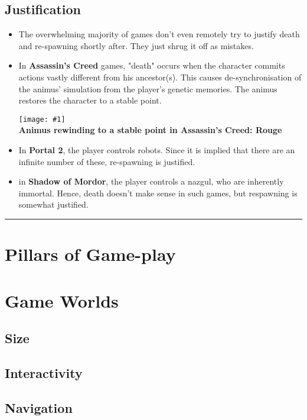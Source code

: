 \documentclass[12pt]{article}
\newcommand{\drawline}{\vspace{2mm}\hrule}
\newcommand{\fig}[3]{\begin{center} \texttt{[image: \#1]}\\ \textbf{#3} \end{center}}
\begin{document}
\subsection{Justification}

\begin{itemize}

\item The overwhelming majority of games don't even remotely try to justify death and re-spawning shortly after. They just shrug it off as mistakes.

\item In \textbf{Assassin's Creed} games, "death" occurs when the character commits actions vastly different from his ancestor(s). This causes de-synchronisation of the animus' simulation from the player's genetic memories. The animus restores the character to a stable point.

\fig{ac_rouge_animus.jpg}{0.3}{Animus rewinding to a stable point in Assassin's Creed: Rouge}

\item In \textbf{Portal 2}, the player controls robots. Since it is implied that there are an infinite number of these, re-spawning is justified.

\item in \textbf{Shadow of Mordor}, the player controls a nazgul, who are inherently immortal. Hence, death doesn't make sense in such games, but respawning is somewhat justified.

\end{itemize}

\drawline

\section{Pillars of Game-play}

\section{Game Worlds}

\subsection{Size}

\subsection{Interactivity}

\subsection{Navigation}
\end{document}
